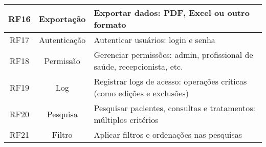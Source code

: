 \begin{quadro}
\begin{tabular}{|c|c|p{10cm}|}
        RF16   & Exportação   & Exportar dados: PDF, Excel ou outro formato \\ \hline
        RF17   & Autenticação & Autenticar usuários: login e senha \\ \hline
        RF18   & Permissão    & Gerenciar permissões: admin, profissional de saúde, recepcionista, etc. \\ \hline
        RF19   & Log          & Registrar logs de acesso: operações críticas (como edições e exclusões) \\ \hline
        RF20   & Pesquisa     & Pesquisar pacientes, consultas e tratamentos: múltiplos critérios \\ \hline
        RF21   & Filtro       & Aplicar filtros e ordenações nas pesquisas \\ \hline
    \end{tabular}
\end{quadro}
